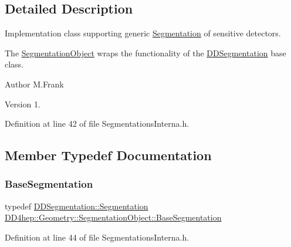 \subsection{Detailed Description}
Implementation class supporting generic \hyperlink{class_d_d4hep_1_1_geometry_1_1_segmentation}{Segmentation} of sensitive detectors. 

The \hyperlink{class_d_d4hep_1_1_geometry_1_1_segmentation_object}{Segmentation\+Object} wraps the functionality of the \hyperlink{namespace_d_d4hep_1_1_d_d_segmentation}{D\+D\+Segmentation} base class.

\begin{DoxyAuthor}{Author}
M.\+Frank 
\end{DoxyAuthor}
\begin{DoxyVersion}{Version}
1. 
\end{DoxyVersion}


Definition at line 42 of file Segmentations\+Interna.\+h.



\subsection{Member Typedef Documentation}
\hypertarget{class_d_d4hep_1_1_geometry_1_1_segmentation_object_a57ca8eb515f079fdc61916df50468818}{}\label{class_d_d4hep_1_1_geometry_1_1_segmentation_object_a57ca8eb515f079fdc61916df50468818} 
\subsubsection{\texorpdfstring{Base\+Segmentation}{BaseSegmentation}}
{\footnotesize\ttfamily typedef \hyperlink{class_d_d4hep_1_1_d_d_segmentation_1_1_segmentation}{D\+D\+Segmentation\+::\+Segmentation} \hyperlink{class_d_d4hep_1_1_geometry_1_1_segmentation_object_a57ca8eb515f079fdc61916df50468818}{D\+D4hep\+::\+Geometry\+::\+Segmentation\+Object\+::\+Base\+Segmentation}}



Definition at line 44 of file Segmentations\+Interna.\+h.

\hypertarget{class_d_d4hep_1_1_geometry_1_1_segmentation_object_a0d017ffe7385b6fe44bf411386cc672b}{}\label{class_d_d4hep_1_1_geometry_1_1_segmentation_object_a0d017ffe7385b6fe44bf411386cc672b} 
